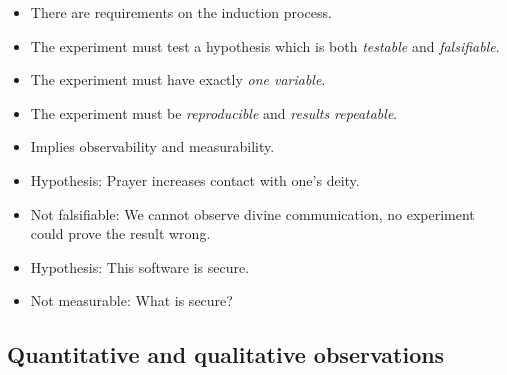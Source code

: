 \begin{frame}
  \begin{remark}
    \begin{itemize}
      \item There are requirements on the induction process.
      \item The experiment must test a hypothesis which is both \emph{testable} 
        and \emph{falsifiable}.
      \item The experiment must have exactly \emph{one variable}.
      \item The experiment must be \emph{reproducible} and \emph{results 
          repeatable}.
    \end{itemize}
  \end{remark}
\end{frame}

\begin{frame}
  \begin{example}
    \begin{itemize}
      \item Implies observability and measurability.
      \item Hypothesis: Prayer increases contact with one's deity.
      \item Not falsifiable: We cannot observe divine communication, no 
        experiment could prove the result wrong.
    \end{itemize}
  \end{example}

  \pause

  \begin{example}
    \begin{itemize}
      \item Hypothesis: This software is secure.
      \item Not measurable: What is secure?
    \end{itemize}
  \end{example}
\end{frame}

\subsection{Quantitative and qualitative observations}

